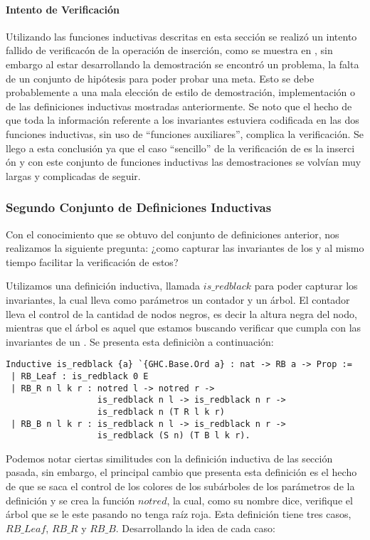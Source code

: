 \paragraph{Intento de Verificaci\'on}
Utilizando las funciones inductivas descritas en esta secci\'on se realiz\'o un intento fallido de
verificac\'on de la operaci\'on de inserci\'on, como se muestra en \cite{appel}, sin embargo al
estar desarrollando la demostraci\'on se encontró un problema, la falta de un conjunto de
hipótesis para poder probar una meta. Esto se debe probablemente a una mala elección de estilo de
demostraci\'on, implementaci\'on o de las definiciones inductivas mostradas anteriormente. Se noto
que el hecho de que toda la informaci\'on referente a los invariantes estuviera codificada en las
dos funciones inductivas, sin uso de ``funciones auxiliares'', complica la verificaci\'on. Se
llego a esta conclusi\'on ya que el caso ``sencillo'' de la verificaci\'on de {\arns} es la inserci
\'on y con este conjunto de funciones inductivas las demostraciones se volvían muy largas y
complicadas de seguir.

\subsubsection{Segundo Conjunto de Definiciones Inductivas}

Con el conocimiento que se obtuvo del conjunto de definiciones anterior, nos realizamos la
siguiente pregunta: ¿como capturar las invariantes de los {\arns} y al mismo tiempo facilitar la
verificaci\'on de estos?

Utilizamos una definición inductiva, llamada $is\_redblack$ para poder capturar los invariantes,
la cual lleva como parámetros un contador y un \'arbol. El contador lleva el control de la
cantidad de nodos negros, es decir la altura negra del nodo, mientras que el \'arbol es aquel que
estamos buscando verificar que cumpla con las invariantes de un {\arn}. Se presenta esta definici\`
on a continuaci\'on:

\begin{verbatim}
Inductive is_redblack {a} `{GHC.Base.Ord a} : nat -> RB a -> Prop :=
 | RB_Leaf : is_redblack 0 E
 | RB_R n l k r : notred l -> notred r ->
                  is_redblack n l -> is_redblack n r ->
                  is_redblack n (T R l k r)
 | RB_B n l k r : is_redblack n l -> is_redblack n r ->
                  is_redblack (S n) (T B l k r).
\end{verbatim}

Podemos notar ciertas similitudes con la definición inductiva de las secci\'on pasada, sin
embargo, el
principal cambio que presenta esta definición es el hecho de que se saca el control de los colores
de los subárboles de los parámetros de la definici\'on y se crea la funci\'on $notred$, la cual,
como su nombre dice, verifique el \'arbol que se le este pasando no tenga raíz roja. Esta
definici\'on tiene tres casos,$RB\_Leaf$, $RB\_R$ y $RB\_B$. Desarrollando la idea de cada caso:

